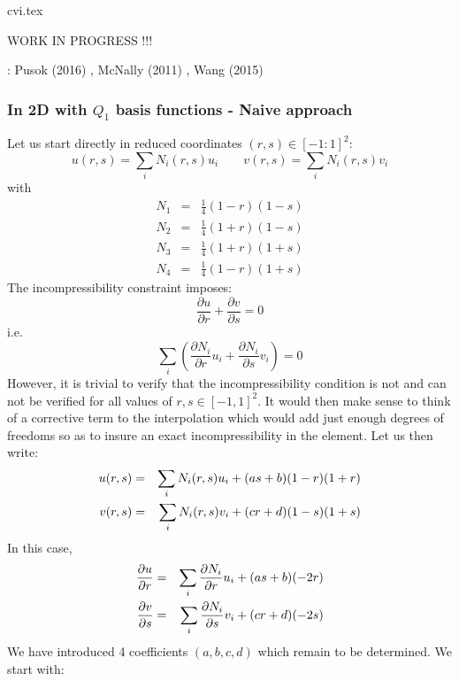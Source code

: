 \begin{flushright} {\tiny {\color{gray} cvi.tex}} \end{flushright}

WORK IN PROGRESS !!!


\Literature: Pusok \etal (2016) \cite{pukp16}, McNally (2011) \cite{mcna11}, Wang \etal (2015) \cite{waav15}

\subsubsection{In 2D with $Q_1$ basis functions - Naive approach}

Let us start directly in reduced coordinates $(r,s)\in [-1:1]^2$:
\[
u(r,s)=\sum_i N_i(r,s) u_i
\quad
\quad
v(r,s)=\sum_i N_i(r,s) v_i
\]
with 
\begin{eqnarray}
N_1&=& \frac{1}{4}(1-r)(1-s)  \nonumber\\ 
N_2&=& \frac{1}{4}(1+r)(1-s)  \nonumber\\ 
N_3&=& \frac{1}{4}(1+r)(1+s)  \nonumber\\ 
N_4&=& \frac{1}{4}(1-r)(1+s)  \nonumber
\end{eqnarray}
The incompressibility constraint imposes:
\[
\frac{\partial u}{\partial r}+
\frac{\partial v}{\partial s}=0
\]
i.e.
\[
\sum_i \left(  
\frac{\partial N_i}{\partial r} u_i+
\frac{\partial N_i}{\partial s} v_i
\right)
=0
\]
However, it is trivial to verify that the incompressibility 
condition is not and can not be verified for all values of  
$r,s \in [-1,1]^2$.
It would then make sense to think of a corrective term to the interpolation
which would add just enough degrees of freedoms so as to insure an exact
incompressibility in the element. 
Let us then write:
\begin{eqnarray}
u(r,s)&=&\sum_i N_i(r,s) u_i + (a s + b)(1-r)(1+r) \nonumber\\
v(r,s)&=&\sum_i N_i(r,s) v_i + (c r + d)(1-s)(1+s) \nonumber
\end{eqnarray}
In this case,
\begin{eqnarray}
\frac{\partial u}{\partial r}&=&\sum_i \frac{\partial N_i}{\partial r} u_i + (a s + b) (-2r) \nonumber\\
\frac{\partial v}{\partial s}&=&\sum_i \frac{\partial N_i}{\partial s} v_i + (c r + d)(-2s) \nonumber
\end{eqnarray}
We have introduced 4 coefficients  $(a,b,c,d)$ which remain to be determined. 
We start with:
